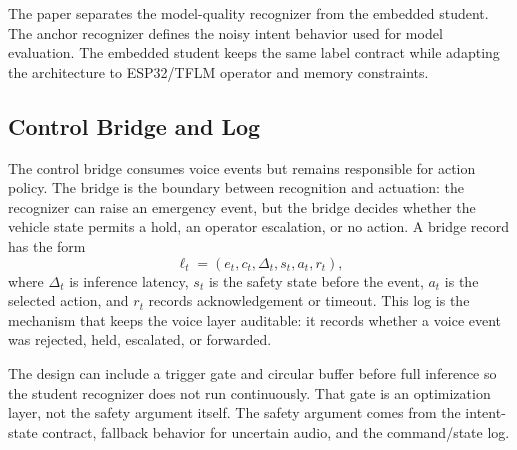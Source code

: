 The paper separates the model-quality recognizer from the embedded student. The anchor recognizer defines the noisy intent behavior used for model evaluation. The embedded student keeps the same label contract while adapting the architecture to ESP32/TFLM operator and memory constraints.

\subsection{Control Bridge and Log}

The control bridge consumes voice events but remains responsible for action policy. The bridge is the boundary between recognition and actuation: the recognizer can raise an emergency event, but the bridge decides whether the vehicle state permits a hold, an operator escalation, or no action. A bridge record has the form
\[
\ell_t = (e_t, c_t, \Delta_t, s_t, a_t, r_t),
\]
where $\Delta_t$ is inference latency, $s_t$ is the safety state before the event, $a_t$ is the selected action, and $r_t$ records acknowledgement or timeout. This log is the mechanism that keeps the voice layer auditable: it records whether a voice event was rejected, held, escalated, or forwarded.

The design can include a trigger gate and circular buffer before full inference so the student recognizer does not run continuously. That gate is an optimization layer, not the safety argument itself. The safety argument comes from the intent-state contract, fallback behavior for uncertain audio, and the command/state log.
